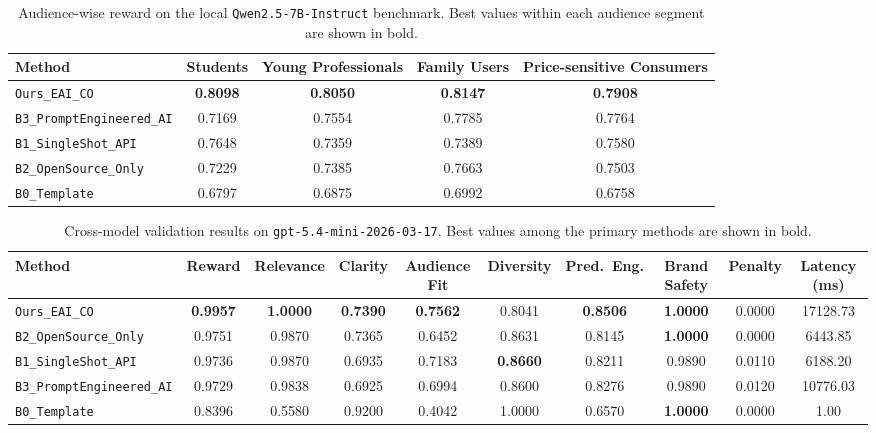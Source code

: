 \documentclass[applsci,article,submit,pdftex,moreauthors]{Definitions/mdpi}
\begin{document}
\begin{table}[t]
\centering
\caption{Audience-wise reward on the local \texttt{Qwen2.5-7B-Instruct} benchmark. Best values within each audience segment are shown in bold.}
\label{tab:qwen_audience}
\begin{adjustbox}{max width=\textwidth}
\begin{tabular}{lcccc}
\toprule
Method & Students & Young Professionals & Family Users & Price-sensitive Consumers \\
\midrule
\texttt{Ours\_EAI\_CO} & \textbf{0.8098} & \textbf{0.8050} & \textbf{0.8147} & \textbf{0.7908} \\
\texttt{B3\_PromptEngineered\_AI} & 0.7169 & 0.7554 & 0.7785 & 0.7764 \\
\texttt{B1\_SingleShot\_API} & 0.7648 & 0.7359 & 0.7389 & 0.7580 \\
\texttt{B2\_OpenSource\_Only} & 0.7229 & 0.7385 & 0.7663 & 0.7503 \\
\texttt{B0\_Template} & 0.6797 & 0.6875 & 0.6992 & 0.6758 \\
\bottomrule
\end{tabular}
\end{adjustbox}
\end{table}

\begin{table}[t]
\centering
\caption{Cross-model validation results on \texttt{gpt-5.4-mini-2026-03-17}. Best values among the primary methods are shown in bold.}
\label{tab:gpt_cross_model}
\begin{adjustbox}{max width=\textwidth}
\begin{tabular}{lccccccccc}
\toprule
Method & Reward & Relevance & Clarity & Audience Fit & Diversity & Pred.\ Eng. & Brand Safety & Penalty & Latency (ms) \\
\midrule
\texttt{Ours\_EAI\_CO} & \textbf{0.9957} & \textbf{1.0000} & \textbf{0.7390} & \textbf{0.7562} & 0.8041 & \textbf{0.8506} & \textbf{1.0000} & 0.0000 & 17128.73 \\
\texttt{B2\_OpenSource\_Only} & 0.9751 & 0.9870 & 0.7365 & 0.6452 & 0.8631 & 0.8145 & \textbf{1.0000} & 0.0000 & 6443.85 \\
\texttt{B1\_SingleShot\_API} & 0.9736 & 0.9870 & 0.6935 & 0.7183 & \textbf{0.8660} & 0.8211 & 0.9890 & 0.0110 & 6188.20 \\
\texttt{B3\_PromptEngineered\_AI} & 0.9729 & 0.9838 & 0.6925 & 0.6994 & 0.8600 & 0.8276 & 0.9890 & 0.0120 & 10776.03 \\
\texttt{B0\_Template} & 0.8396 & 0.5580 & 0.9200 & 0.4042 & 1.0000 & 0.6570 & \textbf{1.0000} & 0.0000 & 1.00 \\
\bottomrule
\end{tabular}
\end{adjustbox}
\end{table}
\end{document}
